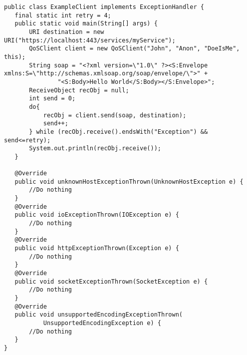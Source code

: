 \begin{lstlisting}[caption={A simple example client}, label=userguideExampleclient]
public class ExampleClient implements ExceptionHandler {
   final static int retry = 4;
   public static void main(String[] args) {
       URI destination = new URI("https://localhost:443/services/myService");
       QoSClient client = new QoSClient("John", "Anon", "DoeIsMe", this);
       String soap = "<?xml version=\"1.0\" ?><S:Envelope xmlns:S=\"http://schemas.xmlsoap.org/soap/envelope/\">" +
               "<S:Body>Hello World</S:Body></S:Envelope>";
       ReceiveObject recObj = null;
       int send = 0;
       do{
           recObj = client.send(soap, destination);
           send++;
       } while (recObj.receive().endsWith("Exception") && send<=retry);
       System.out.println(recObj.receive());
   }

   @Override
   public void unknownHostExceptionThrown(UnknownHostException e) {
       //Do nothing
   }
   @Override
   public void ioExceptionThrown(IOException e) {
       //Do nothing
   }
   @Override
   public void httpExceptionThrown(Exception e) {
       //Do nothing    
   }
   @Override
   public void socketExceptionThrown(SocketException e) {
       //Do nothing    
   }
   @Override
   public void unsupportedEncodingExceptionThrown(
           UnsupportedEncodingException e) {
       //Do nothing    
   }
}
\end{lstlisting}
